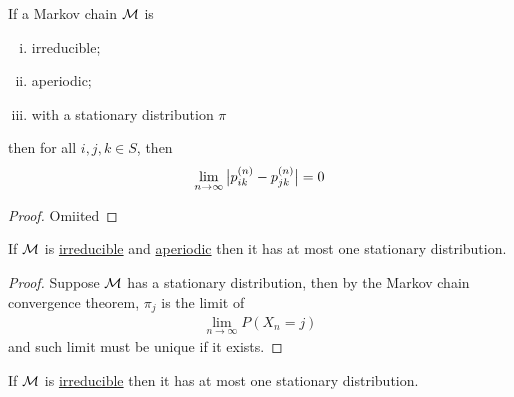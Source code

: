 \documentclass{article}
\newcommand{\upn}[0]{^{(n)}}
\begin{document}
	\begin{lemma}
		If a Markov chain $\mathcal{{M}}$ is
		\begin{enumerate}[(i)]
			\item irreducible;
			\item aperiodic;
			\item with a stationary distribution $\pi$
		\end{enumerate}
		then for all $i, j, k \in S$, then
		\begin{align}
			\lim_{n \to \infty} \abs{
				p_{ik}\upn - p_{jk}\upn
			} = 0
		\end{align}
	\end{lemma}
	
	\begin{proof}
		Omiited
	\end{proof}
	
	\begin{corollary}
		If $\mathcal{{M}}$ is \ul{irreducible} and \ul{aperiodic} then it has at most one stationary distribution.
	\end{corollary}

	\begin{proof}
		Suppose $\mathcal{{M}}$ has a stationary distribution, then by the Markov chain convergence theorem, $\pi_j$ is the limit of 
		\begin{align}
			\lim_{n \to \infty} P(X_n = j)
		\end{align}
		and such limit must be unique if it exists.
	\end{proof}

	\begin{corollary}
		If $\mathcal{{M}}$ is \ul{irreducible} then it has at most one stationary distribution.
	\end{corollary}
\end{document}
